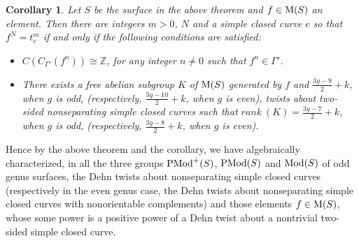 \documentclass[11 pt]{amsart}
\newtheorem{Corollary}[Theorem]{Corollary}
\theoremstyle{definition}
\begin{document}
\begin{Corollary}\label{Cor-1.1} Let $S$ be the surface in the above theorem and
$f \in {\rm M}(S)$ an element. Then there are integers $m>0$, $N$
and a simple closed curve $c$ so that $f^N=t_c^m$ if and only if the
following conditions are satisfied:

\begin{itemize}

\item[i)] $C(C_{\Gamma'}(f^{n})) \cong \mathbb{Z}$, for any integer
$n \neq 0$ such that $f^{n} \in \Gamma'$.

\item[ii)] There exists a free abelian subgroup $K$
of ${\rm M}(S)$ generated by $f$ and $\displaystyle\frac{3g-9}{2}
+k$, when $g$ is odd, (respectively, $\displaystyle\frac{3g-10}{2}
+k$, when $g$ is even), twists about two-sided nonseparating simple
closed curves such that $rank \ (K)=\displaystyle\frac{3g-7}{2} +
k$, when $g$ is odd, (respectively, $\displaystyle\frac{3g-8}{2}
+k$, when $g$ is even).
\end{itemize}
\end{Corollary}

Hence by the above theorem and the corollary, we have algebraically
characterized, in all the three groups ${\rm PMod}^+(S)$, ${\rm
PMod}(S)$ and ${\rm Mod}(S)$ of odd genus surfaces, the Dehn twists
about nonseparating simple closed curves (respectively in the even
genus case, the Dehn twists about nonseparating simple closed curves
with nonorientable complements) and those elements $f \in {\rm
M}(S)$, whose some power is a positive power of a Dehn twist about a
nontrivial two-sided simple closed curve.
\end{document}
